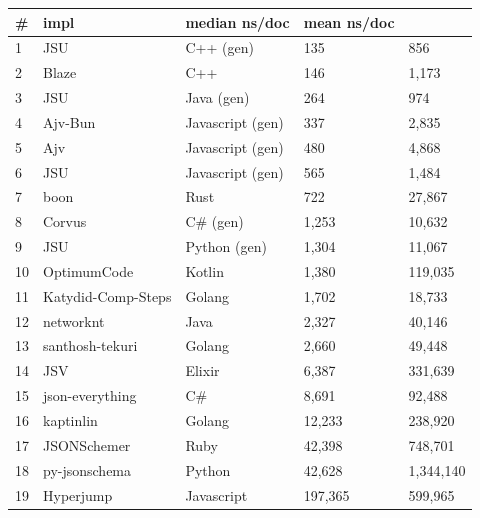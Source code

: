 \begin{tabular}{ll|l|ll}
\# & impl & median ns/doc & mean ns/doc \\
\hline
1 & JSU & C++ (gen) & 135 & 856 \\
2 & Blaze & C++ & 146 & 1,173 \\
3 & JSU & Java (gen) & 264 & 974 \\
4 & Ajv-Bun & Javascript (gen) & 337 & 2,835 \\
5 & Ajv & Javascript (gen) & 480 & 4,868 \\
6 & JSU & Javascript (gen) & 565 & 1,484 \\
7 & boon & Rust & 722 & 27,867 \\
8 & Corvus & C\# (gen) & 1,253 & 10,632 \\
9 & JSU & Python (gen) & 1,304 & 11,067 \\
10 & OptimumCode & Kotlin & 1,380 & 119,035 \\
11 & Katydid-Comp-Steps & Golang & 1,702 & 18,733 \\
12 & networknt & Java & 2,327 & 40,146 \\
13 & santhosh-tekuri & Golang & 2,660 & 49,448 \\
14 & JSV & Elixir & 6,387 & 331,639 \\
15 & json-everything & C\# & 8,691 & 92,488 \\
16 & kaptinlin & Golang & 12,233 & 238,920 \\
17 & JSONSchemer & Ruby & 42,398 & 748,701 \\
18 & py-jsonschema & Python & 42,628 & 1,344,140 \\
19 & Hyperjump & Javascript & 197,365 & 599,965 \\
\end{tabular}
